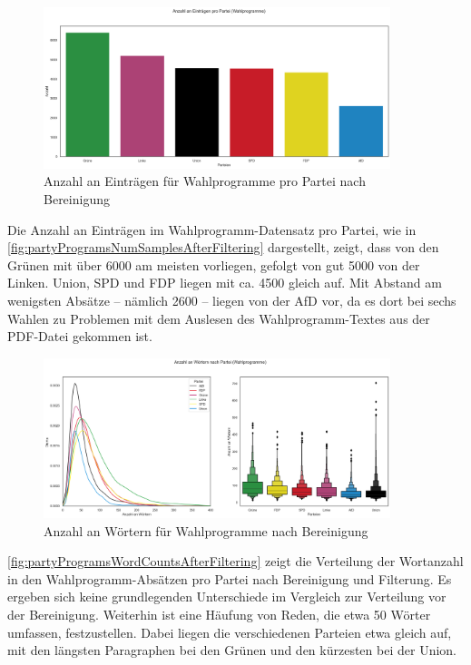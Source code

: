 \begin{figure}[H]
    \centering
    \includegraphics[width=0.9\textwidth]{data/images/party_programs/party_programs_num_samples_after_filter.png}
    \caption{Anzahl an Einträgen für Wahlprogramme pro Partei nach Bereinigung} \label{fig:partyProgramsNumSamplesAfterFiltering}
\end{figure}

Die Anzahl an Einträgen im Wahlprogramm-Datensatz pro Partei, wie in \autoref{fig:partyProgramsNumSamplesAfterFiltering} dargestellt, zeigt, dass von den Grünen mit über \num{6000} am meisten vorliegen, gefolgt von gut \num{5000} von der Linken. Union, \ac{SPD} und \ac{FDP} liegen mit ca. \num{4500} gleich auf. Mit Abstand am wenigsten Absätze -- nämlich \num{2600} -- liegen von der \ac{AfD} vor, da es dort bei sechs Wahlen zu Problemen mit dem Auslesen des Wahlprogramm-Textes aus der \ac{PDF}-Datei gekommen ist.

\begin{figure}[H]
    \centering
    \includegraphics[width=0.9\textwidth]{data/images/party_programs/party_programs_word_count_after_filter.png}
    \caption{Anzahl an Wörtern für Wahlprogramme nach Bereinigung} \label{fig:partyProgramsWordCountsAfterFiltering}
\end{figure}

\autoref{fig:partyProgramsWordCountsAfterFiltering} zeigt die Verteilung der Wortanzahl in den Wahlprogramm-Absätzen pro Partei nach Bereinigung und Filterung. Es ergeben sich keine grundlegenden Unterschiede im Vergleich zur Verteilung vor der Bereinigung. Weiterhin ist eine Häufung von Reden, die etwa \num{50} Wörter umfassen, festzustellen. Dabei liegen die verschiedenen Parteien etwa gleich auf, mit den längsten Paragraphen bei den Grünen und den kürzesten bei der Union.

